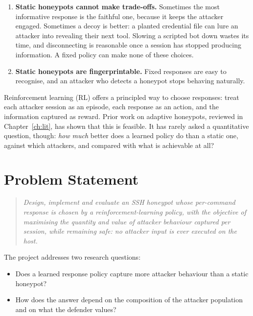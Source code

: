 \begin{enumerate}
  \item \textbf{Static honeypots cannot make trade-offs.} Sometimes the most informative
    response is the faithful one, because it keeps the attacker engaged. Sometimes a decoy is
    better: a planted credential file can lure an attacker into revealing their next tool. Slowing
    a scripted bot down wastes its time, and disconnecting is reasonable once a session has
    stopped producing information. A fixed policy can make none of these choices.
  \item \textbf{Static honeypots are fingerprintable.} Fixed responses are easy to recognise,
    and an attacker who detects a honeypot stops behaving naturally.
\end{enumerate}

Reinforcement learning (RL) offers a principled way to choose responses: treat each attacker
session as an episode, each response as an action, and the information captured as reward.
Prior work on adaptive honeypots, reviewed in Chapter~\ref{ch:lit}, has shown that this is
feasible. It has rarely asked a quantitative question, though: \emph{how much} better does a
learned policy do than a static one, against which attackers, and compared with what is
achievable at all?

\section{Problem Statement}

\begin{quote}
\emph{Design, implement and evaluate an SSH honeypot whose per-command response is chosen by
a reinforcement-learning policy, with the objective of maximising the quantity and value of
attacker behaviour captured per session, while remaining safe: no attacker input is ever
executed on the host.}
\end{quote}

The project addresses two research questions:

\begin{itemize}
  \item[\textbf{RQ1.}] Does a learned response policy capture more attacker behaviour than a
    static honeypot?
  \item[\textbf{RQ2.}] How does the answer depend on the composition of the attacker population
    and on what the defender values?
\end{itemize}

